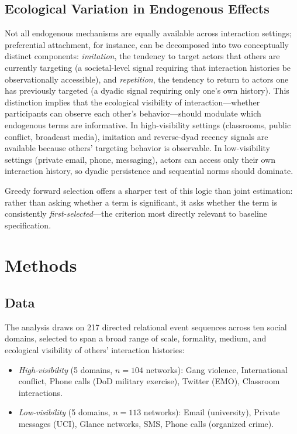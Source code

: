\documentclass[11pt]{article}
\begin{document}
\subsection{Ecological Variation in Endogenous Effects}

Not all endogenous mechanisms are equally available across interaction settings;
preferential attachment, for instance, can be decomposed into two conceptually
distinct components: \textit{imitation}, the tendency to target actors that
others are currently targeting (a societal-level signal requiring that interaction
histories be observationally accessible), and \textit{repetition}, the tendency
to return to actors one has previously targeted (a dyadic signal requiring only
one's own history). This distinction implies that the ecological visibility of
interaction---whether participants can observe each other's behavior---should
modulate which endogenous terms are informative. In high-visibility settings
(classrooms, public conflict, broadcast media), imitation and reverse-dyad
recency signals are available because others' targeting behavior is observable.
In low-visibility settings (private email, phone, messaging), actors can access
only their own interaction history, so dyadic persistence and sequential norms
should dominate.

Greedy forward selection offers a sharper test of this logic than joint
estimation: rather than asking whether a term is significant, it asks whether
the term is consistently \emph{first-selected}---the criterion most directly
relevant to baseline specification.

\section{Methods}

\subsection{Data}

The analysis draws on 217 directed relational event sequences across ten social
domains, selected to span a broad range of scale, formality, medium, and
ecological visibility of others' interaction histories:

\begin{itemize}[leftmargin=2em]
  \item \textit{High-visibility} (5 domains, $n = 104$ networks): Gang violence,
        International conflict, Phone calls (DoD military exercise),
        Twitter (EMO), Classroom interactions.
  \item \textit{Low-visibility} (5 domains, $n = 113$ networks): Email (university),
        Private messages (UCI), Glance networks, SMS, Phone calls
        (organized crime).
\end{itemize}
\end{document}
